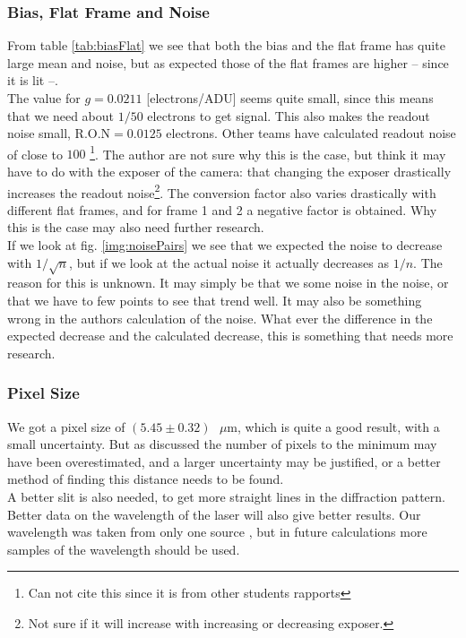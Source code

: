 \documentclass{emulateapj}
\begin{document}
\subsubsection{Bias, Flat Frame and Noise}
From table \ref{tab:biasFlat} we see that both the bias and the flat frame has quite large mean and noise, but as expected those of the flat frames are higher -- since it is lit --. \\

The value for $g = 0.0211$ [electrons/ADU] seems quite small, since this means that we need about $1/50$ electrons to get signal. This also makes the readout noise small, R.O.N$=0.0125$ electrons. Other teams have calculated readout noise of close to $100$ \footnote{Can not cite this since it is from other students rapports}. The author are not sure why this is the case, but think it may have to do with the exposer of the camera: that changing the exposer drastically increases the readout noise\footnote{Not sure if it will increase with increasing or decreasing exposer.}. The conversion factor also varies drastically with different flat frames, and for frame 1 and 2 a negative factor is obtained. Why this is the case may also need further research.\\

If we look at fig. \ref{img:noisePairs} we see that we expected the noise to decrease with $1/\sqrt{n}$, but if we look at the actual noise it actually  decreases as $1/n$. The reason for this is unknown. It may simply be that we some noise in the noise, or that we have to few points to see that trend well. It may also be something wrong in the authors calculation of the noise. What ever the difference in the expected decrease and the calculated decrease, this is something that needs more research.

\subsubsection{Pixel Size}
We got a pixel size of $(5.45 \pm 0.32) \text{ }\mu$m, which is quite a good result, with a small uncertainty. But as discussed the number of pixels to the minimum may have been overestimated, and a larger uncertainty may be justified, or a better method of finding this distance needs to be found.\\

A better slit is also needed, to get more straight lines in the diffraction pattern. Better data on the wavelength of the laser will also give better results. Our wavelength was taken from only one source \cite{laser}, but in future calculations more samples of the wavelength should be used.
\end{document}
